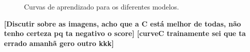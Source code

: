 \documentclass[conference]{IEEEtran}
\begin{document}
\begin{figure}[!h]
{{		}
	}
	\quad
	\quad
	\caption{Curvas de aprendizado para os diferentes modelos.}
	\label{fig:learningcurves}
\end{figure}

\textbf{[Discutir sobre as imagens, acho que a C está melhor de todas, não tenho certeza pq ta negativo o score] [curveC trainamente sei que ta errado amanhã gero outro kkk]}
\end{document}

